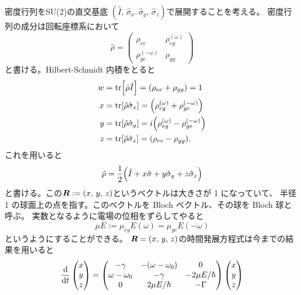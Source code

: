 \documentclass[11pt,dvipdfmx,a4paper]{jsarticle}
\begin{document}
密度行列をSU(2)の直交基底
\((\hat{I},\,\hat{\sigma}_x.\,\hat{\sigma}_y,\,\hat{\sigma}_z)\)で展開することを考える。
密度行列の成分は回転座標系において
\begin{equation}
	\hat{\rho} =
	\begin{pmatrix}
		\rho_{ee} & \rho_{eg}^{(\omega)}\\
		\rho_{ge}^{(-\omega)} & \rho_{gg}
	\end{pmatrix}
\end{equation}
と書ける。Hilbert-Schmidt 内積をとると
\begin{align}
	w &= \tr [\hat{\rho}\hat{I}]
	= \qty(\rho_{ee}+\rho_{gg}) = 1\\
	x &= \tr [\hat{\rho}\hat{\sigma}_x]
	= \qty(\rho_{eg}^{(\omega)}+\rho_{ge}^{(-\omega)})\\
	y &= \tr [\hat{\rho}\hat{\sigma}_y]
	= i\qty(\rho_{eg}^{(\omega)}-\rho_{ge}^{(-\omega)})\\
	z &= \tr [\hat{\rho}\hat{\sigma}_z]
	= \qty(\rho_{ee}-\rho_{gg}).
\end{align}
これを用いると
\begin{equation}
	\hat{\rho} = \frac{1}{2}\qty(\hat{I}+x\hat{\sigma}+y\hat{\sigma}_y+z\hat{\sigma}_z)
\end{equation}
と書ける。この\(\vb*{R} := (x,\,y,\,z)\)というベクトルは大きさが 1 になっていて、
半径 1 の球面上の点を指す。このベクトルを Bloch ベクトル、その球を Bloch 球と呼ぶ。
実数となるように電場の位相をずらしてやると
\begin{equation}
	\mu E := \mu_{eg}E(\omega) = \mu_{ge}E(-\omega)
\end{equation}
というようにすることができる。
\(\vb*{R} = (x,\,y,\,z)\)の時間発展方程式は今までの結果を用いると
\begin{equation}
	\dv{t}
	\begin{pmatrix}
		x\\ y\\ z
	\end{pmatrix}
	=
	\begin{pmatrix}
		-\gamma & -(\omega-\omega_0) & 0\\
		\omega -\omega_0 & -\gamma & -2\mu E/\hbar\\
		0 & 2\mu E/\hbar & -\Gamma
	\end{pmatrix}
	\begin{pmatrix}
		x\\ y\\ z
	\end{pmatrix}
\end{equation}
\end{document}
